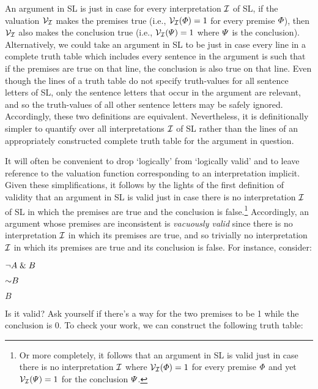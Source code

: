 An argument in SL is  just in case for every interpretation $\mathcal{I}$ of SL, if the valuation $\mathcal{V}_{\mathcal{I}}$ makes the premises true (i.e., $\mathcal{V}_{\mathcal{I}}(\varPhi{})=1$ for every premise $\varPhi{}$), then $\mathcal{V}_{\mathcal{I}}$ also makes the conclusion true (i.e., $\mathcal{V}_{\mathcal{I}}(\varPsi{})=1$ where $\varPsi{}$ is the conclusion).
Alternatively, we could take an argument in SL to be  just in case every line in a complete truth table which includes every sentence in the argument is such that if the premises are true on that line, the conclusion is also true on that line.
Even though the lines of a truth table do not specify truth-values for all sentence letters of SL, only the sentence letters that occur in the argument are relevant, and so the truth-values of all other sentence letters may be safely ignored.
Accordingly, these two definitions are equivalent.
Nevertheless, it is definitionally simpler to quantify over all interpretations $\mathcal{I}$ of SL rather than the lines of an appropriately constructed complete truth table for the argument in question.

It will often be convenient to drop `logically' from `logically valid' and to leave reference to the valuation function corresponding to an interpretation implicit.
Given these simplifications, it follows by the lights of the first definition of validity that an argument in SL is valid just in case there is no interpretation $\mathcal{I}$ of SL in which the premises are true and the conclusion is false.\footnote{Or more completely, it follows that an argument in SL is valid just in case there is no interpretation $\mathcal{I}$ where $\mathcal{V}_{\mathcal{I}}(\varPhi{})=1$ for every premise $\varPhi{}$ and yet $\mathcal{V}_{\mathcal{I}}(\varPsi{})=1$ for the conclusion $\varPsi{}$.}
Accordingly, an argument whose premises are inconsistent is \textit{vacuously valid} since there is no interpretation $\mathcal{I}$ in which its premises are true, and so trivially no interpretation $\mathcal{I}$ in which its premises are true and its conclusion is false.
For instance, consider:
    
\begin{earg}
  \item[] $\neg A \mathrel\& B$
  \item[] $\enot B$
  \item[\therefore] $B$
\end{earg}

Is it valid? 
Ask yourself if there's a way for the two premises to be 1 while the conclusion is 0.
To check your work, we can construct the following truth table:

